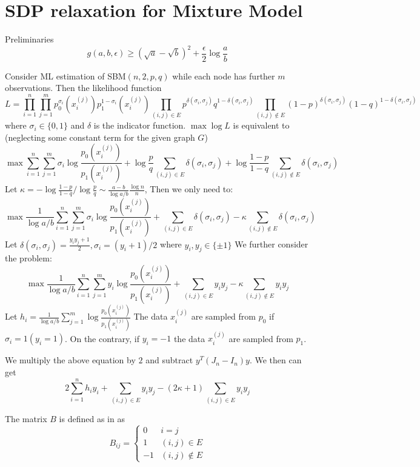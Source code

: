 \documentclass{article}
\begin{document}
\section{SDP relaxation for Mixture Model}
Preliminaries
\begin{equation}\label{eq:g_linear}
g(a,b,\epsilon) \geq  (\sqrt{a} - \sqrt{b})^2 + \frac{\epsilon}{2}\log \frac{a}{b} 
\end{equation}

Consider ML estimation of SBM$(n,2,p,q)$ while each node has further $m$ observations.
Then the likelihood function
$$
L=\prod_{i=1}^n \prod_{j=1}^m p_0^{\sigma_i}(x_i^{(j)})p_1^{1-\sigma_i}(x_i^{(j)})\prod_{(i,j) \in E} p^{\delta(\sigma_i, \sigma_j)}q^{1-\delta(\sigma_i, \sigma_j)}
\prod_{(i,j)\not\in E} (1-p)^{\delta(\sigma_i, \sigma_j)}(1-q)^{1-\delta(\sigma_i, \sigma_j)}
$$
where $\sigma_i \in \{0,1\}$ and $\delta$ is the indicator function.
$\max \log L$ is equivalent to (neglecting some constant term for the given graph $G$)
$$
\max \sum_{i=1}^n \sum_{j=1}^m \sigma_i \log \frac{p_0(x_i^{(j)})}{p_1(x_i^{(j)})}
+\log\frac{p}{q}\sum_{(i,j) \in E} \delta(\sigma_i, \sigma_j)
+\log \frac{1-p}{1-q}\sum_{(i,j)\not\in E} \delta(\sigma_i, \sigma_j)
$$
Let $\kappa = -\log\frac{1-p}{1-q} / \log\frac{p}{q} \sim \frac{a-b}{\log a/b}\frac{\log n}{n}$,
Then we only need to:
$$
\max \frac{1}{\log a/b}\sum_{i=1}^n \sum_{j=1}^m \sigma_i \log \frac{p_0(x_i^{(j)})}{p_1(x_i^{(j)})}
+\sum_{(i,j) \in E} \delta(\sigma_i, \sigma_j)
-\kappa\sum_{(i,j)\not\in E} \delta(\sigma_i, \sigma_j)
$$
Let $\delta(\sigma_i, \sigma_j) = \frac{y_i y_j + 1}{2}, \sigma_i = (y_i+1)/2$ where $y_i,y_j \in \{\pm 1 \}$
We further consider the problem:
$$
\max \frac{1}{\log a/b}\sum_{i=1}^n \sum_{j=1}^m y_i \log \frac{p_0(x_i^{(j)})}{p_1(x_i^{(j)})}
+\sum_{(i,j) \in E} y_i y_j
-\kappa\sum_{(i,j)\not\in E} y_i y_j
$$
Let $h_i = \frac{1}{\log a/b}\sum_{j=1}^m \log \frac{p_0(x_i^{(j)})}{p_1(x_i^{(j)})}$
The data $x_i^{(j)}$ are sampled from $p_0$ if $\sigma_i = 1 (y_i = 1)$. On the contrary,
if $y_i = -1$ the data $x_i^{(j)}$ are sampled from $p_1$.

We multiply the above equation by $2$ and subtract $y^T(J_n-I_n)y$. We then can get
$$
2\sum_{i=1}^n h_iy_i + \sum_{(i,j)\in E} y_i y_j - (2\kappa+1) \sum_{(i,j)\in E} y_i y_j
$$

The matrix $B$ is defined as in \cite{abbe} as
\begin{equation}
B_{ij} = \begin{cases}
0 & i=j \\
1 & (i,j) \in E \\
-1 & (i,j) \not\in E
\end{cases}
\end{equation}
\end{document}
